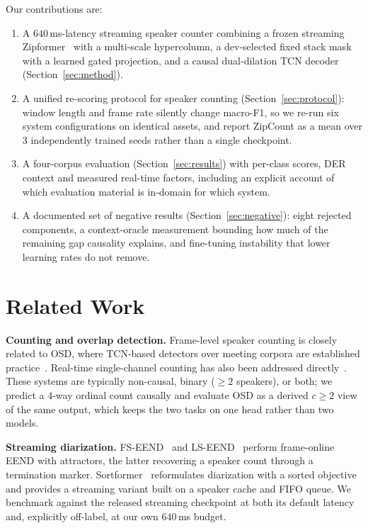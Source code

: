 \documentclass[journal]{IEEEtran}
\newcommand{\sys}{ZipCount}
\begin{document}
Our contributions are:
\begin{enumerate}
\item A $640$\,ms-latency streaming speaker counter combining a frozen
streaming Zipformer~\cite{yao2024zipformer} with a multi-scale hypercolumn,
a dev-selected fixed stack mask with a learned gated projection, and a
causal dual-dilation TCN decoder (Section~\ref{sec:method}).
\item A unified re-scoring protocol for speaker counting
(Section~\ref{sec:protocol}): window length and frame rate silently change
macro-F1, so we re-run six system configurations on identical assets, and
report \sys{} as a mean over 3 independently trained seeds rather than a
single checkpoint.
\item A four-corpus evaluation (Section~\ref{sec:results}) with per-class
scores, DER context and measured real-time factors, including an explicit
account of which evaluation material is in-domain for which system.
\item A documented set of negative results (Section~\ref{sec:negative}):
eight rejected components, a context-oracle measurement bounding how much of
the remaining gap causality explains, and fine-tuning instability that lower
learning rates do not remove.
\end{enumerate}

\section{Related Work}

\textbf{Counting and overlap detection.} Frame-level speaker counting is
closely related to OSD, where TCN-based detectors over meeting corpora are
established practice~\cite{cornell2020osd,bullock2020overlap}. Real-time
single-channel counting has also been addressed
directly~\cite{yousefi2021realtime}. These systems are typically non-causal,
binary ($\geq\!2$ speakers), or both; we predict a 4-way ordinal count
causally and evaluate OSD as a derived $c\!\geq\!2$ view of the same output,
which keeps the two tasks on one head rather than two models.

\textbf{Streaming diarization.} FS-EEND~\cite{liang2024fseend} and
LS-EEND~\cite{liang2025lseend} perform frame-online EEND with attractors,
the latter recovering a speaker count through a termination marker.
Sortformer~\cite{park2024sortformer} reformulates diarization with a sorted
objective and provides a streaming variant built on a speaker cache and FIFO
queue. We benchmark against the released streaming checkpoint at both its
default latency and, explicitly off-label, at our own $640$\,ms budget.
\end{document}

